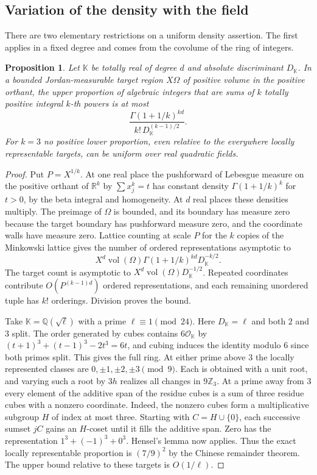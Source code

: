 \documentclass[11pt,letterpaper]{article}
\newtheorem{proposition}[proposition]{Proposition}
\theoremstyle{definition}
\numberwithin{equation}{section}
\begin{document}
\subsection{Variation of the density with the field}
There are two elementary restrictions on a uniform density assertion.
The first applies in a fixed degree and comes from the covolume of the
ring of integers.

\begin{proposition}\label{nf3:covol}
Let $\mathbb K$ be totally real of degree $d$ and absolute discriminant
$D_{\mathbb K}$. In a bounded Jordan-measurable target region $X\Omega$ of
positive volume in the positive orthant, the upper proportion of algebraic
integers that are sums of $k$ totally positive integral $k$-th powers is at most
\[
 \frac{\Gamma(1+1/k)^{kd}}{k!\,D_{\mathbb K}^{(k-1)/2}}.
\]
For $k=3$ no positive lower proportion, even relative to the everywhere
locally representable targets, can be uniform over real quadratic fields.
\end{proposition}
\begin{proof}
Put $P=X^{1/k}$. At one real place the pushforward of Lebesgue measure on
the positive orthant of $\mathbb R^k$ by $\sum x_j^k=t$ has constant
density $\Gamma(1+1/k)^k$ for $t>0$, by the beta integral and homogeneity.
At $d$ real places these densities multiply. The preimage of $\Omega$ is
bounded, and its boundary has measure zero because the target boundary has
pushforward measure zero, and the coordinate walls have measure zero.
Lattice counting at scale $P$ for the $k$ copies of the Minkowski lattice
gives the number of ordered representations asymptotic to
\[
 X^d\operatorname{vol}(\Omega)\Gamma(1+1/k)^{kd}D_{\mathbb K}^{-k/2}.
\]
The target count is asymptotic to $X^d\operatorname{vol}(\Omega)D_{\mathbb K}^{-1/2}$.
Repeated coordinates contribute $O(P^{(k-1)d})$ ordered representations,
and each remaining unordered tuple has $k!$ orderings. Division proves the bound.

Take $\mathbb K=\mathbb Q(\sqrt\ell)$ with a prime $\ell\equiv1\pmod {24}$.
Here $D_{\mathbb K}=\ell$ and both $2$ and $3$ split. The order generated
by cubes contains $6\mathcal O_{\mathbb K}$ by
$(t+1)^3+(t-1)^3-2t^3=6t$, and cubing induces the identity modulo $6$
since both primes split. This gives the full ring. At either prime above $3$ the locally represented
classes are $0,\pm1,\pm2,\pm3\pmod9$. Each is obtained with a unit root,
and varying such a root by $3h$ realizes all changes in $9\mathbb Z_3$.
At a prime away from $3$ every element of the additive span of the residue
cubes is a sum of three residue cubes with a nonzero coordinate. Indeed,
the nonzero cubes form a multiplicative subgroup $H$ of index at most
three. Starting with $C=H\cup\{0\}$, each successive sumset $jC$ gains an
$H$-coset until it fills the additive span. Zero has the representation
$1^3+(-1)^3+0^3$. Hensel's lemma now applies. Thus the exact locally
representable proportion is $(7/9)^2$ by the Chinese remainder theorem.
The upper bound relative to these targets is $O(1/\ell)$.
\end{proof}
\end{document}
